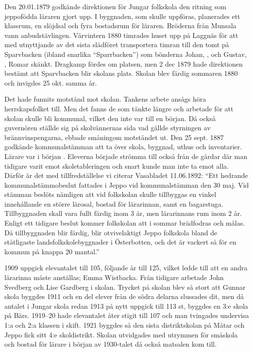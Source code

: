 %



%
Den 20.01.1879 godkände direktionen för Jungar folkskola den ritning som jeppofödda läraren  gjort upp. I byggnaden, som skulle uppföras, planerades ett klassrum, en slöjdsal och fyra bostadsrum för läraren. Bröderna  från Munsala vann anbudstävlingen. Vårvintern 1880 timrades huset upp på Laggnäs för att med utnyttjande av det sista slädföret transportera timran till den tomt på Sparvbacken (ibland snarlika ``Sparrbacken'') som bönderna Johan, , och Gustav, , Romar skänkt. Dragkamp fördes om platsen, men 2 dec 1879 hade direktionen bestämt att Sparvbacken blir skolans plats. Skolan blev färdig sommaren 1880 och invigdes 25 okt. samma år.

Det hade funnits motstånd mot skolan. Tankens arbete ansågs höra herrskapsfolket till. Men det fanns de som tänkte längre och arbetade för att skolan skulle bli kommunal, vilket den inte var till en början. Då också guvernören ställde sig på skolvännernas sida vad gällde styrningen av brännvinspengarna, ebbade småningom motståndet ut. Den 25 sept. 1887 godkände kommunalstämman att ta över skola, byggnad, uthus och inventarier. Lärare var i början . Eleverna började strömma till också från de gårdar där man tidigare varit emot skoletableringen och snart kunde man inte ta emot alla. Därför är det  med tillfredställelse vi citerar Vasabladet 11.06.1892: ``Ett hedrande kommunalstämmobeslut fattades i Jeppo vid kommunalstämman den 30 maj. Vid stämman beslöts nämligen att vid folkskolan skulle tillbyggas en vinkel innehållande en större lärosal, bostad för lärarinnan, samt en bagarstuga. Tillbyggnaden skall vara fullt färdig inom 3 år, men lärarinnans rum inom 2 år. Enligt ett tidigare beslut kommer folkskolan att i sommar brädfodras och målas. Då tillbyggnaden blir färdig, blir otvivelaktigt Jeppo folkskola bland de ståtligaste landsfolkskolebyggnader i Österbotten, och det är vackert så för en kommun på knappa 20 mantal.''

1909 uppgick elevantalet till 105, följande år till 125, vilket ledde till att en andra lärarinna måste anställas; Emma Wistbacka. Från tidigare arbetade John Svedberg och Lise Gardberg i skolan. Trycket på skolan blev så stort att Gunnar skola byggdes 1911 och en del elever från de södra delarna slussades dit, men då antalet i Jungar skola redan 1913 på nytt uppgick till 113 st, byggdes en 3:e skola på Bärs. 1919--20 hade elevantalet åter stigit till 107 och man tvingades undervisa 1:a och 2:a klassen i skift. 1921 byggdes så den sista distriktskolan på Måtar och Jeppo fick sitt 4:e skoldistrikt. Skolan utvidgades med utrymmen för småskola och bostad för lärare i början av 1930-talet då också matsalen kom till.

